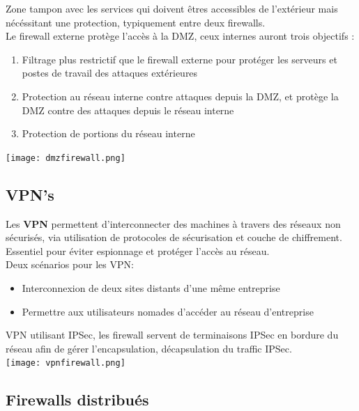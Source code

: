 \documentclass{report}
\begin{document}
			Zone tampon avec les services qui doivent êtres accessibles de l'extérieur mais nécéssitant une protection, typiquement entre deux firewalls.\\

			Le firewall externe protège l'accès à la DMZ, ceux internes auront trois objectifs : \\

			\begin{enumerate}
				\item Filtrage plus restrictif que le firewall externe pour protéger les serveurs et postes de travail des attaques extérieures
				\item Protection au réseau interne contre attaques depuis la DMZ, et protège la DMZ contre des attaques depuis le réseau interne
				\item Protection de portions du réseau interne\\
			\end{enumerate}

			\texttt{[image: dmzfirewall.png]}

		\subsection{VPN's}

			Les \textbf{VPN} permettent d'interconnecter des machines à travers des réseaux non sécurisés, via utilisation de protocoles de sécurisation et couche de chiffrement.\\
			Essentiel pour éviter espionnage et protéger l'accès au réseau.\\

			Deux scénarios pour les VPN: \\
			\begin{itemize}
				\item Interconnexion de deux sites distants d'une même entreprise
				\item Permettre aux utilisateurs nomades d'accéder au réseau d'entreprise\\
			\end{itemize}

			VPN utilisant IPSec, les firewall servent de terminaisons IPSec en bordure du réseau afin de gérer l'encapsulation, décapsulation du traffic IPSec.\\

			\texttt{[image: vpnfirewall.png]}

		\subsection{Firewalls distribués}
\end{document}
